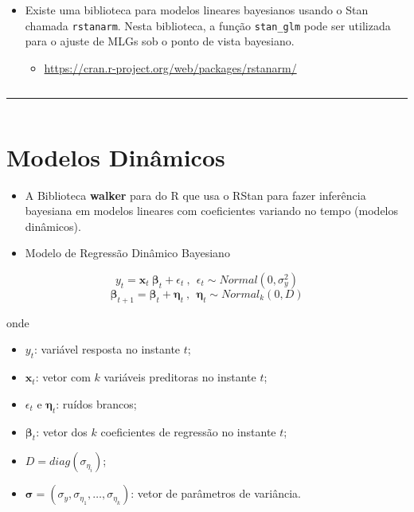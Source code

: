 \documentclass[
]{book}
\providecommand{\tightlist}{%
  \setlength{\itemsep}{0pt}\setlength{\parskip}{0pt}}
\begin{document}
\(~\)

\begin{itemize}
\item
  Existe uma biblioteca para modelos lineares bayesianos usando o Stan chamada \texttt{rstanarm}. Nesta biblioteca, a função \texttt{stan\_glm} pode ser utilizada para o ajuste de MLGs sob o ponto de vista bayesiano.

  \begin{itemize}
  \tightlist
  \item
    \url{https://cran.r-project.org/web/packages/rstanarm/}
  \end{itemize}
\end{itemize}

\(~\)

\begin{center}\rule{0.5\linewidth}{0.5pt}\end{center}

\(~\)

\hypertarget{modelos-dinuxe2micos}{%
\section{Modelos Dinâmicos}\label{modelos-dinuxe2micos}}

\begin{itemize}
\item
  A Biblioteca \textbf{walker} para do R que usa o RStan para fazer inferência bayesiana em modelos lineares com coeficientes variando no tempo (modelos dinâmicos).
\item
  Modelo de Regressão Dinâmico Bayesiano
\end{itemize}

\[y_t = \boldsymbol x_t~\boldsymbol\beta_t + \epsilon_t ~,~~ \epsilon_t \sim \textit{Normal}(0,\sigma_y^2)\]
\[\boldsymbol\beta_{t+1} = \boldsymbol\beta_t + \boldsymbol\eta_t ~,~~ \boldsymbol\eta_t \sim \textit{Normal}_k(0,D)\]

onde

\begin{itemize}
\item
  \(y_t\): variável resposta no instante \(t\);
\item
  \(\boldsymbol x_t\): vetor com \(k\) variáveis preditoras no instante \(t\);
\item
  \(\epsilon_t\) e \(\boldsymbol\eta_t\): ruídos brancos;
\item
  \(\boldsymbol\beta_t\): vetor dos \(k\) coeficientes de regressão no instante \(t\);
\item
  \(D=\textit{diag}({\sigma}_{\eta_i})\);
\item
  \(\boldsymbol\sigma=\left(\sigma_y,{\sigma}_{\eta_1},\ldots,{\sigma}_{\eta_k}\right)\): vetor de parâmetros de variância.
\end{itemize}
\end{document}
